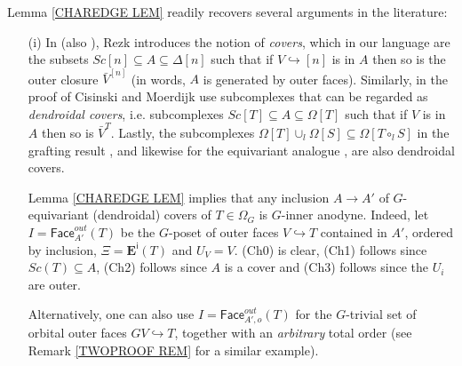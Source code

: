 \documentclass[a4paper,10pt
]{article}%
\begin{document}


\begin{remark} \label{RECOVER REM}
Lemma \ref{CHAREDGE LEM} readily recovers several arguments in the literature:
\begin{itemize}
\item[(i)] In \cite[\S 10]{Rez01} (also \cite[\S 6.2]{Rez10}), Rezk introduces the notion of \textit{covers}, which in our language are the subsets
$Sc[n] \subseteq A \subseteq \Delta[n]$
such that if $V \hookrightarrow [n]$ is in $A$ then so is the outer closure $\bar{V}^{[n]}$
(in words, $A$ is generated by outer faces).
Similarly, in the proof of \cite[Prop. 2.4]{CM13a}
Cisinski and Moerdijk use subcomplexes
that can be regarded as
\textit{dendroidal covers},
i.e. subcomplexes
$Sc[T] \subseteq A \subseteq \Omega[T]$
such that if $V$ is in $A$ then so is $\bar{V}^{T}$.
Lastly, the subcomplexes 
$\Omega[T] \cup_l \Omega[S] \subseteq \Omega[T \circ_l S]$
in the grafting result \cite[Lemma 5.2]{MW09},
and likewise for the equivariant analogue \cite[Prop. 6.19]{Per17}, are also dendroidal covers.

Lemma \ref{CHAREDGE LEM} implies
that any inclusion $A \to A'$ of $G$-equivariant (dendroidal) covers of $T\in \Omega_G$
is $G$-inner anodyne. 
Indeed, let $I=\mathsf{Face}_{A'}^{out}(T)$ be the $G$-poset of outer faces $V \hookrightarrow T$ contained in $A'$, ordered by inclusion, 
$\Xi = \boldsymbol{E}^{\mathsf{i}}(T)$ and $U_V = V$.
(Ch0) is clear, (Ch1) follows since 
$Sc(T) \subseteq A$, (Ch2) follows since $A$ is a cover and
(Ch3) follows since the $U_i$ are outer.

Alternatively, one can also use $I=\mathsf{Face}_{A',o}^{out}(T)$
for the $G$-trivial set of orbital outer faces 
$GV \hookrightarrow T$,
together with an \textit{arbitrary} total order (see Remark \ref{TWOPROOF REM} for a similar example).


\end{itemize}
\end{remark}
\end{document}
